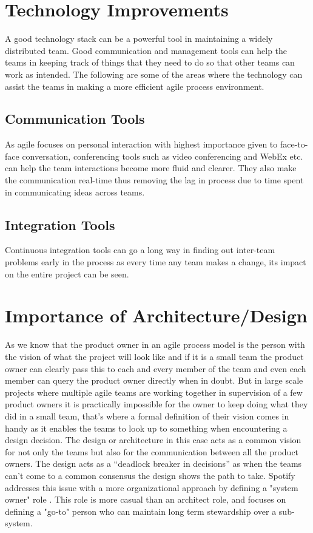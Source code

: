 \section{Technology Improvements} 
\label{sec:tech_impv}
	A good technology stack can be a powerful tool in maintaining a widely distributed team.
	Good communication and management tools can help the teams in keeping track of things that they need to do so that other teams can work as intended.
	The following are some of the areas where the technology can assist the teams in making a more efficient agile process environment.

\subsection{Communication Tools} As agile focuses on personal interaction with highest importance given to face-to-face conversation, conferencing tools such as video conferencing and WebEx etc. can help the team interactions become more fluid and clearer.
They also make the communication real-time thus removing the lag in process due to time spent in communicating ideas across teams.

\subsection{Integration Tools} Continuous integration tools can go a long way in finding out inter-team problems early in the process as every time any team makes a change, its impact on the entire project can be seen.

\section{Importance of Architecture/Design}\label{sec:imp_of_dsgn}

As we know that the product owner in an agile process model is the person with the vision of what the project will look like and if it is a small team the product owner can clearly pass this to each and every member of the team and even each member can query the product owner directly when in doubt.
But in large scale projects where multiple agile teams are working together in supervision of a few product owners it is practically impossible for the owner to keep doing what they did in a small team, that’s where a formal definition of their vision comes in handy as it enables the teams to look up to something when encountering a design decision.
The design or architecture in this case acts as a common vision for not only the teams but also for the communication between all the product owners.
The design acts as a “deadlock breaker in decisions” \cite{architecureRole_article} as when the teams can’t come to a common consensus the design shows the path to take.
Spotify addresses this issue with a more organizational approach by defining a "system owner" role \cite{kniberg12}.
This role is more casual than an architect role, and focuses on defining a "go-to" person who can maintain long term stewardship over a sub-system. 
